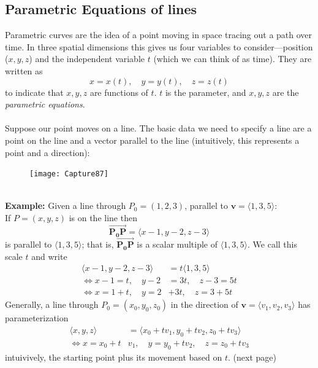 \documentclass{report}
\begin{document}
\subsection{Parametric Equations of lines} %
Parametric curves are the idea of a point moving in space tracing out a path over time. 
In three spatial dimensions this gives us four variables to consider---position 
($x,y,z$) and the independent variable $t$ (which we can think of as time). They are written as
\begin{equation*}
x=x(t),\quad y=y(t),\quad z=z(t)
\end{equation*}
to indicate that $x,y,z$ are functions of $t$. $t$ is the parameter, and $x,y,z$ 
are the \textit{parametric equations}.\\
\vspace{1mm}\\
Suppose our point moves on a line. The basic data we need to specify a line are 
a point on the line and a vector parallel to the line (intuitively, this represents a point and a direction):
\begin{figure}[h]
\texttt{[image: Capture87]}\\
\centering
\end{figure}\\
\textbf{Example:} Given a line through $P_0=(1,2,3)$, parallel to $\mathbf{v}=\langle 1,3,5\rangle$:\\
If $P=(x,y,z)$ is on the line then
\begin{equation*}
\overrightarrow{\mathbf{P_0P}}=\langle x-1,y-2,z-3\rangle
\end{equation*}
is parallel to $\langle 1,3,5\rangle$; that is, $\overrightarrow{\mathbf{P_0P}}$ is 
a scalar multiple of $\langle 1,3,5\rangle$. We call this scale $t$ and write
\begin{align*}
\langle x-1,y-2,z-3\rangle&=t\langle 1,3,5\rangle\\
\iff x-1=t,\quad y-2&=3t,\quad z-3=5t\\
\iff x=1+t,\quad y=2&+3t,\quad z=3+5t
\end{align*}
Generally, a line through $P_0=(x_0,y_0,z_0)$ in the direction of $\mathbf{v}=
\langle v_1,v_2,v_3\rangle$ has parameterization
\begin{align*}
\langle x,y,z\rangle&=\langle x_0+tv_1,y_0+tv_2,z_0+tv_3\rangle\\
\iff x=x_0+t&v_1,\quad y=y_0+tv_2,\quad z=z_0+tv_3
\end{align*}
intuivively, the starting point plus its movement based on $t$.
(next page)
\end{document}
